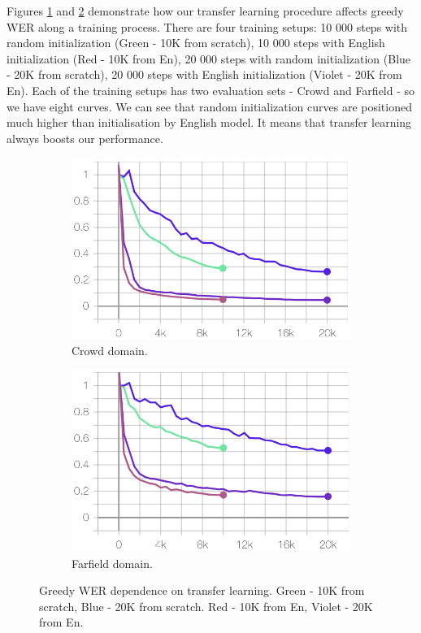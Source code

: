 \documentclass[a4paper]{article}
\begin{document}
Figures \ref{fig:crowd_domain} and \ref{fig:portal_domain} demonstrate how our transfer learning procedure affects greedy WER along a training process. There are four training setups: 10 000 steps with random initialization (Green - 10K from scratch), 10 000 steps with English initialization (Red - 10K from En), 20 000 steps with random initialization (Blue - 20K from scratch), 20 000 steps with English initialization (Violet - 20K from En). Each of the training setups has two evaluation sets - Crowd and Farfield - so we have eight curves. We can see that random initialization curves are positioned much higher than initialisation by English model. It means that transfer learning always boosts our performance.

\begin{figure}[ht]
\begin{subfigure}{.99\linewidth}
  \centering
  \includegraphics[width=1.\linewidth]{LaTeX/img/crowd10k20k.png}  
  \caption{Crowd domain.}
  \label{fig:crowd_domain}
\end{subfigure}
\begin{subfigure}{.99\linewidth}
  \centering
  \includegraphics[width=1.\linewidth]{LaTeX/img/portal10k20k.png}  
  \caption{Farfield domain.}
  \label{fig:portal_domain}
\end{subfigure}
\caption{Greedy WER dependence on transfer learning. Green - 10K from scratch, Blue - 20K from scratch. Red - 10K from En, Violet - 20K from En.}
\label{fig:portal_crowd_domain}
\end{figure}
\end{document}

